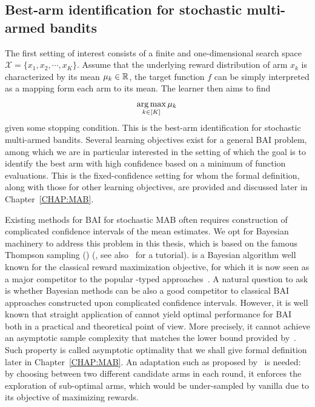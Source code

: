\subsection{Best-arm identification for stochastic multi-armed bandits}\label{sec:intro.mab.bai}

The first setting of interest consists of a finite and one-dimensional search space $\mathcal{X} = \{x_1,x_2,\cdots,x_K\}$. Assume that the underlying reward distribution of arm $x_k$ is characterized by its mean $\mu_k\in\mathbb{R}$, the target function $f$ can be simply interpreted as a mapping form each arm to its mean. The learner then aims to find
\begin{align}\label{eq:optim_bai}
    \operatorname*{arg\,max}_{k\in[K]} \mu_k\,
\end{align}
given some stopping condition. This is the best-arm identification for stochastic multi-armed bandits. Several learning objectives exist for a general BAI problem, among which we are in particular interested in the setting of which the goal is to identify the best arm with high confidence based on a minimum of function evaluations. This is the \gls{fixed-confidence setting} for whom the formal definition, along with those for other learning objectives, are provided and discussed later in Chapter~\ref{CHAP:MAB}.

Existing methods for BAI for stochastic MAB often requires construction of complicated confidence intervals of the mean estimates. We opt for Bayesian machinery to address this problem in this thesis, which is based on the famous Thompson sampling (\TS) (\citealt{thompson1933}, see also~\citealt{russo2018} for a tutorial). \TS is a Bayesian algorithm well known for the classical reward maximization objective, for which it is now seen as a major competitor to the popular \UCB-typed approaches~\citep{auer2002ucb}. A natural question to ask is whether Bayesian methods can be also a good competitor to classical BAI approaches constructed upon complicated confidence intervals. However, it is well known that straight application of \TS cannot yield optimal performance for BAI both in a practical and theoretical point of view. More precisely, it cannot achieve an asymptotic \gls{sample complexity} that matches the lower bound provided by~\cite{garivier2016tracknstop}. Such property is called \gls{asymptotic optimality} that we shall give formal definition later in Chapter~\ref{CHAP:MAB}. An adaptation such as \TTTS proposed by~\cite{russo2016ttts} is needed: by choosing between two different candidate arms in each round, it enforces the exploration of sub-optimal arms, which would be under-sampled by vanilla \TS due to its objective of maximizing rewards. 


